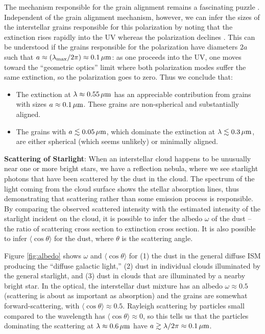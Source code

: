 \documentclass[a4paper,10pt]{article}
\begin{document}
{\noindent}The mechanism responsible for the grain alignment remains a fascinating puzzle . Independent of the grain alignment mechanism, however, we can infer the sizes of the interstellar grains responsible for this polarization by noting that the extinction rises rapidly into the UV whereas the polarization declines . This can be understood if the grains responsible for the polarization have diameters $2a$ such that $a\approx(\lambda_{\rm max}/2\pi)\approx0.1\,\mu{\rm m}$: as one proceeds into the UV, one moves toward the ``geometric optics'' limit where both polarization modes suffer the same extinction, so the polarization goes to zero. Thus we conclude that:

\begin{itemize}
    \item The extinction at $\lambda\approx0.55\,\mu{\rm m}$ has an appreciable contribution from grains with sizes $a\approx0.1\,\mu{\rm m}$. These grains are non-spherical and substantially aligned.
    \item The grains with $a\lesssim0.05\,\mu{\rm m}$, which dominate the extinction at $\lambda\lesssim0.3\,\mu{\rm m}$, are either spherical (which seems unlikely) or minimally aligned.
\end{itemize}

{\noindent}\textbf{Scattering of Starlight}: When an interstellar cloud happens to be unusually near one or more bright stars, we have a reflection nebula, where we see starlight photons that have been scattered by the dust in the cloud. The spectrum of the light coming from the cloud surface shows the stellar absorption lines, thus demonstrating that scattering rather than some emission process is responsible. By comparing the observed scattered intensity with the estimated intensity of the starlight incident on the cloud, it is possible to infer the albedo $\omega$ of the dust -- the ratio of scattering cross section to extinction cross section. It is also possible to infer $\langle\cos\theta\rangle$ for the dust, where $\theta$ is the scattering angle.

{\noindent}Figure \ref{fig:albedo} shows $\omega$ and $\langle\cos\theta\rangle$ for (1) the dust in the general diffuse ISM producing the ``diffuse galactic light,'' (2) dust in individual clouds illuminated by the general starlight, and (3) dust in clouds that are illuminated by a nearby bright star. In the optical, the interstellar dust mixture has an albedo $\omega\approx0.5$ (scattering is about as important as absorption) and the grains are somewhat forward-scattering, with $\langle\cos\theta\rangle\approx0.5$. Rayleigh scattering by particles small compared to the wavelength has $\langle\cos\theta\rangle\approx0$, so this tells us that the particles dominating the scattering at $\lambda\approx0.6\,\mu{\rm m}$ have $a\gtrsim\lambda/2\pi\approx0.1\,\mu{\rm m}$.
\end{document}
